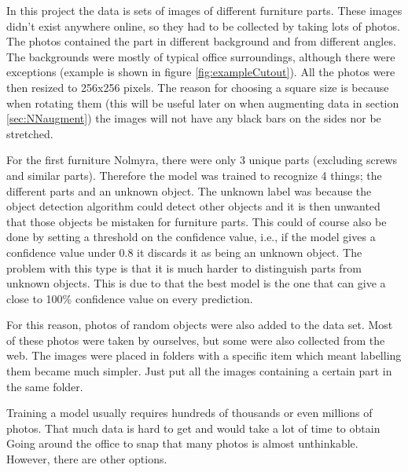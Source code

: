 In this project the data is sets of images of different furniture parts. These images didn't exist anywhere online, so they had to be collected by taking lots of photos. The photos contained the part in different background and from different angles. The backgrounds were mostly of typical office surroundings, although there were exceptions (example is shown in figure \ref{fig:exampleCutout}). All the photos were then resized to 256x256 pixels.
The reason for choosing a square size is because when rotating them
(this will be useful later on when augmenting data in section \ref{sec:NNaugment}) 
the images will not have any black bars on the sides nor be stretched.

For the first furniture Nolmyra, there were only 3 unique parts (excluding screws and similar parts). Therefore the model was trained to recognize 4 things; the different parts and an unknown object. The unknown label was because the object detection algorithm could detect other objects and it is then unwanted that those objects be mistaken for furniture parts. This could of course also be done by setting a threshold on the confidence value, i.e., if the model gives a confidence value under 0.8 it discards it as being an unknown object. The problem with this type is that it is much harder to distinguish parts from unknown objects. This is due to that the best model is the one that can give a close to 100\% confidence value on every prediction.

For this reason, photos of random objects were also added to the data set. Most of these photos were taken by ourselves, but some were also collected from the web. The images were placed in folders with a specific item which meant labelling them became much simpler. Just put all the images containing a certain part in the same folder.

Training a model usually requires hundreds of thousands or even millions of photos. That much data is hard to get and would take a lot of time to obtain Going around the office to snap that many photos is almost unthinkable.
However, there are other options.

